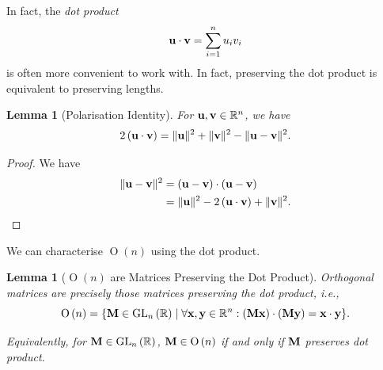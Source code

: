 \documentclass{article}
\newtheorem{lemma}[theorem]{Lemma}
\theoremstyle{definition}
\theoremstyle{remark}
\newcommand{\pqty}[1]{\left(#1\right)}
\newcommand{\set}[2]{\{#1\mid #2\}}
\newcommand{\RR}{\mathbb{R}}
\newcommand{\GL}{\operatorname{GL}}
\DeclarePairedDelimiter{\norm}{\lVert}{\rVert}
\newcommand{\vdot}{\cdot}
\newcommand{\Or}{\operatorname{O}}
\begin{document}
In fact, the \emph{dot product}
\[
    \vb{u} \vdot \vb{v} = \sum_{i = 1}^{n} u_i v_i
\]
is often more convenient to work with. In fact, preserving the dot product is equivalent to preserving lengths.

\begin{lemma}[Polarisation Identity]
    \label{lem:polarisation-identity}%
    For \(\vb{u}, \vb{v} \in \RR^n\), we have
    \[
        2 \pqty{\vb{u} \vdot \vb{v}} = \norm{\vb{u}}^2 + \norm{\vb{v}}^2 - \norm{\vb{u} - \vb{v}}^2.
    \]
\end{lemma}

\begin{proof}
    We have
    \begin{align*}
        \norm{\vb{u} - \vb{v}}^2 &= \pqty{\vb{u} - \vb{v}} \vdot \pqty{\vb{u} - \vb{v}} \\
        &= \norm{\vb{u}}^2 - 2 \pqty{\vb{u} \vdot \vb{v}} + \norm{\vb{v}}^2.
    \end{align*}
\end{proof}

We can characterise \(\Or\pqty{n}\) using the dot product.

\begin{lemma}[\(\Or\pqty{n}\) are Matrices Preserving the Dot Product]
    \label{lem:orthogonal-dot-product}%
    Orthogonal matrices are precisely those matrices preserving the dot product, i.e.,
    \[
        \Or\pqty{n} = \set{\vb{M} \in \GL_n\pqty{\RR}}{\forall \vb{x}, \vb{y} \in \RR^n: \pqty{\vb{Mx}} \cdot \pqty{\vb{My}} = \vb{x} \cdot \vb{y}}.
    \]

    Equivalently, for \(\vb{M} \in \GL_{n} \pqty{\RR}\), \(\vb{M} \in \Or\pqty{n}\) if and only if \(\vb{M}\) preserves dot product.
\end{lemma}
\end{document}
